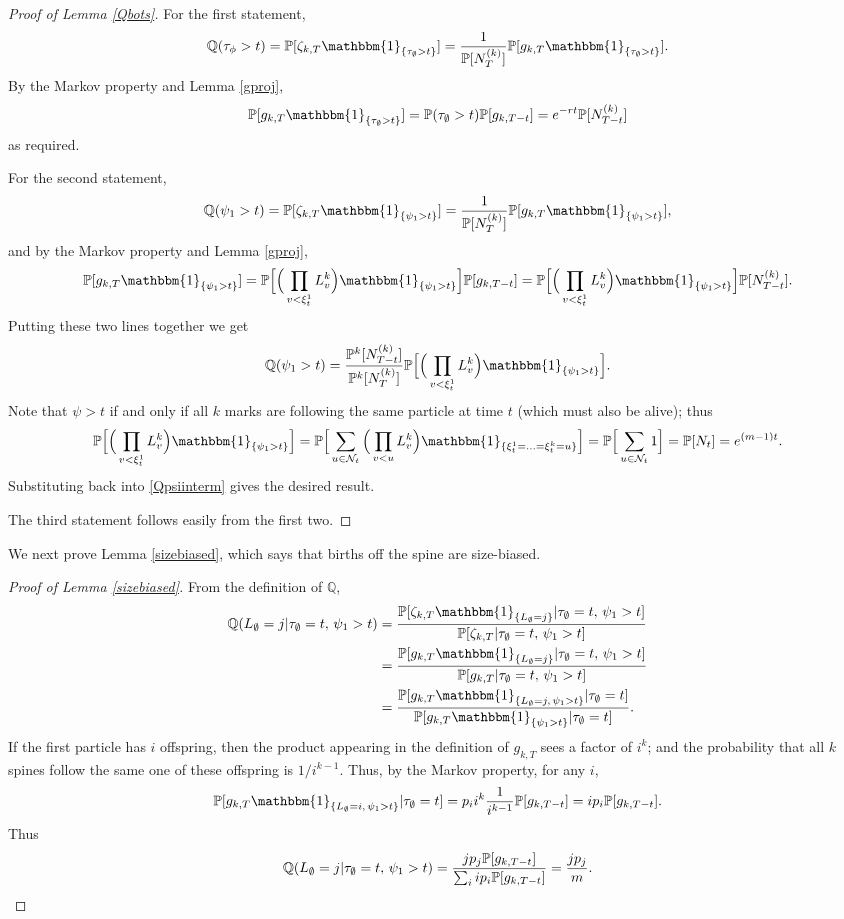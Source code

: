 \documentclass{article}
\theoremstyle{plain}
\theoremstyle{definition}
\newcommand{\Q}{\mathbb{Q}}
\renewcommand{\P}{\mathbb{P}}
\newcommand{\ind}{\mathbbm{1}}
\newcommand{\Nc}{\mathcal{N}}
\begin{document}
\begin{proof}[Proof of Lemma \ref{Qbots}]
For the first statement,
\[\Q(\tau_\phi > t) = \P[\zeta_{k,T}\ind_{\{\tau_\emptyset > t\}}] = \frac{1}{\P[N^{(k)}_T]}\P[g_{k,T}\ind_{\{\tau_\emptyset > t\}}].\]
By the Markov property and Lemma \ref{gproj},
\[\P[g_{k,T}\ind_{\{\tau_\emptyset > t\}}] = \P(\tau_\emptyset>t)\P[g_{k,T-t}] = e^{-rt}\P[N^{(k)}_{T-t}]\]
as required.

For the second statement,
\[\Q(\psi_1 > t) = \P[\zeta_{k,T}\ind_{\{\psi_1 > t\}}] = \frac{1}{\P[N^{(k)}_T]}\P[g_{k,T}\ind_{\{\psi_1 > t\}}],\]
and by the Markov property and Lemma \ref{gproj},
\[\P[g_{k,T}\ind_{\{\psi_1 > t\}}] = \P\Big[\Big(\prod_{v<\xi^1_t} L_v^k\Big)\ind_{\{\psi_1>t\}}\Big]\P[g_{k,T-t}] = \P\Big[\Big(\prod_{v<\xi^1_t} L_v^k\Big)\ind_{\{\psi_1>t\}}\Big]\P[N^{(k)}_{T-t}].\]
Putting these two lines together we get
\begin{equation}\label{Qpsiinterm}
\Q(\psi_1 > t) = \frac{\P^k[N^{(k)}_{T-t}]}{\P^k[N^{(k)}_T]}\P\Big[\Big(\prod_{v<\xi^1_t} L_v^k\Big)\ind_{\{\psi_1>t\}}\Big].
\end{equation}
Note that $\psi>t$ if and only if all $k$ marks are following the same particle at time $t$ (which must also be alive); thus
\[\P\Big[\Big(\prod_{v<\xi^1_t} L_v^k\Big)\ind_{\{\psi_1>t\}}\Big] = \P\Big[\sum_{u\in\Nc_t} \Big(\prod_{v<u} L_v^k\Big) \ind_{\{\xi^1_t = \ldots = \xi^k_t = u\}}\Big] = \P\Big[\sum_{u\in\Nc_t} 1\Big] = \P[N_t] = e^{(m-1)t}.\]
Substituting back into \eqref{Qpsiinterm} gives the desired result.

The third statement follows easily from the first two.
\end{proof}

We next prove Lemma \ref{sizebiased}, which says that births off the spine are size-biased.


\begin{proof}[Proof of Lemma \ref{sizebiased}]
From the definition of $\Q$,
\begin{align*}
\Q(L_\emptyset = j | \tau_\emptyset = t, \, \psi_1>t) &= \frac{\P[\zeta_{k,T}\ind_{\{L_\emptyset=j\}}|\tau_\emptyset=t,\,\psi_1>t]}{\P[\zeta_{k,T}|\tau_\emptyset=t,\,\psi_1>t]}\\
&= \frac{\P[g_{k,T}\ind_{\{L_\emptyset=j\}}|\tau_\emptyset=t,\,\psi_1>t]}{\P[g_{k,T}|\tau_\emptyset=t,\,\psi_1>t]}\\
&= \frac{\P[g_{k,T}\ind_{\{L_\emptyset=j,\, \psi_1>t\}}|\tau_\emptyset=t]}{\P[g_{k,T}\ind_{\{\psi_1>t\}}|\tau_\emptyset=t]}.
\end{align*}
If the first particle has $i$ offspring, then the product appearing in the definition of $g_{k,T}$ sees a factor of $i^k$; and the probability that all $k$ spines follow the same one of these offspring is $1/i^{k-1}$. Thus, by the Markov property, for any $i$,
\[\P[g_{k,T}\ind_{\{L_\emptyset=i,\, \psi_1>t\}}|\tau_\emptyset=t] = p_i i^k \frac{1}{i^{k-1}}\P[g_{k,T-t}] = i p_i \P[g_{k,T-t}].\]
Thus
\[\Q(L_\emptyset = j | \tau_\emptyset = t, \, \psi_1>t) = \frac{j p_j \P[g_{k,T-t}]}{\sum_i i p_i \P[g_{k,T-t}]} = \frac{j p_j}{m}.\qedhere\]
\end{proof}
\end{document}
